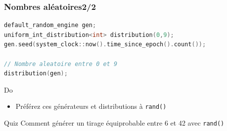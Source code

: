 \documentclass[C++.tex]{subfiles}
\begin{document}
\begin{frame}[fragile]
	\frametitle{Nombres aléatoires\titlehfill{}2/2}
	\begin{lstlisting}[language=C++]
default_random_engine gen;
uniform_int_distribution<int> distribution(0,9);
gen.seed(system_clock::now().time_since_epoch().count());

// Nombre aleatoire entre 0 et 9
distribution(gen);\end{lstlisting}

	\begin{exampleblock}{Do}
		\begin{itemize}
			\item Préférez ces générateurs et distributions à \lstinline|rand()|
		\end{itemize}
	\end{exampleblock}

	\begin{block}{Quiz}
		Comment générer un tirage équiprobable entre 6 et 42 avec \lstinline|rand()|
	\end{block}
\end{frame}
\end{document}
